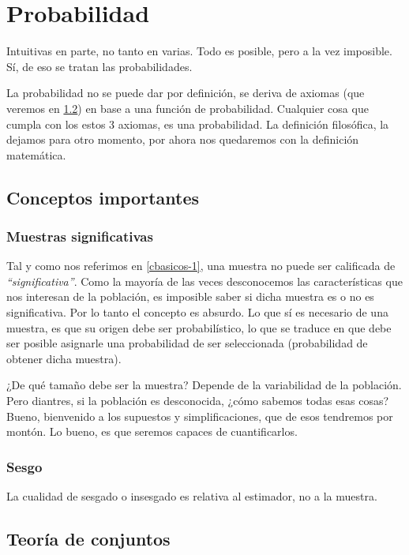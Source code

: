 \documentclass[]{article}
\title{}
\author{}
\date{}
\begin{document}
{
\setcounter{tocdepth}{2}
\tableofcontents
}
\section{Probabilidad}\label{prob-2}

Intuitivas en parte, no tanto en varias. Todo es posible, pero a la vez
imposible. Sí, de eso se tratan las probabilidades.

La probabilidad no se puede dar por definición, se deriva de axiomas
(que veremos en \ref{tconjuntos-2}) en base a una función de
probabilidad. Cualquier cosa que cumpla con los estos 3 axiomas, es una
probabilidad. La definición filosófica, la dejamos para otro momento,
por ahora nos quedaremos con la definición matemática.

\subsection{Conceptos importantes}\label{cimportantes-2}

\subsubsection{Muestras significativas}\label{msignificativas-2}

Tal y como nos referimos en \ref{cbasicos-1}, una muestra no puede ser
calificada de \emph{``significativa''}. Como la mayoría de las veces
desconocemos las características que nos interesan de la población, es
imposible saber si dicha muestra es o no es significativa. Por lo tanto
el concepto es absurdo. Lo que sí es necesario de una muestra, es que su
origen debe ser probabilístico, lo que se traduce en que debe ser
posible asignarle una probabilidad de ser seleccionada (probabilidad de
obtener dicha muestra).

¿De qué tamaño debe ser la muestra? Depende de la variabilidad de la
población. Pero diantres, si la población es desconocida, ¿cómo sabemos
todas esas cosas? Bueno, bienvenido a los supuestos y simplificaciones,
que de esos tendremos por montón. Lo bueno, es que seremos capaces de
cuantificarlos.

\subsubsection{Sesgo}\label{sesgo}

La cualidad de sesgado o insesgado es relativa al estimador, no a la
muestra.

\subsection{Teoría de conjuntos}\label{tconjuntos-2}
\end{document}
